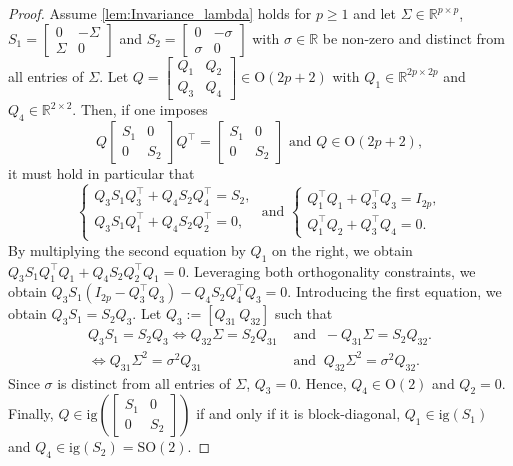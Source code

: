 \documentclass[10pt,a4paper]{amsart}
\begin{document}
\begin{proof}
		Assume \cref{lem:Invariance_lambda} holds for $p\geq 1$ and let $\Sigma\in\mathbb{R}^{p\times p}$, $S_1 = \left[\begin{smallmatrix}
			0&-\Sigma\\
			\Sigma& 0
			\end{smallmatrix}\right]$ and $S_2 = \left[\begin{smallmatrix}
			0&-\sigma\\
			\sigma& 0
			\end{smallmatrix}\right]$ with $\sigma\in\mathbb{R}$ be non-zero and distinct from all entries of $\Sigma$. Let $Q=\left[\begin{smallmatrix}
			Q_1&Q_2\\
			Q_3&Q_4
			\end{smallmatrix}\right]\in\mathrm{O}(2p+2)$ with $Q_1\in\mathbb{R}^{2p\times 2p}$ and $Q_4\in\mathbb{R}^{2\times 2}$. Then, if one imposes\begin{equation*}
			Q\begin{bmatrix}
			S_1&0\\
			0&S_2
			\end{bmatrix}Q^\top =\begin{bmatrix}
			S_1&0\\
			0&S_2
			\end{bmatrix} \text{ and } Q\in \mathrm{O}(2p+2),
			\end{equation*}
			it must hold in particular that
			\begin{equation*}
			\begin{cases}
			Q_3 S_1 Q_3^\top  + Q_4 S_2 Q_4^\top  = S_2,\\
			Q_3 S_1 Q_1^\top  + Q_4 S_2 Q_2^\top  = 0,\\
			\end{cases} \text{ and } \begin{cases}
			Q_1^\top Q_1 + Q_3^\top Q_3 = I_{2p},\\
			Q_1^\top Q_2 + Q_3^\top Q_4 = 0.
			\end{cases}
			\end{equation*}
			By multiplying the second equation by $Q_1$ on the right, we obtain $Q_3 S_1 Q_1^\top Q_1 + Q_4 S_2 Q_2^\top Q_1 = 0$. Leveraging both orthogonality constraints, we obtain $Q_3S_1(I_{2p}-Q_3^\top Q_3)-Q_4S_2Q_4^\top Q_3=0$. Introducing the first equation, we obtain $Q_3S_1=S_2Q_3$. Let $Q_3:=[Q_{31}\ Q_{32}]$ such that \begin{align*}
		Q_3S_1=S_2Q_3 \iff Q_{32}\Sigma = S_2 Q_{31} &\text{ and } \ -Q_{31}\Sigma= S_2Q_{32}.\\
		\iff Q_{31}\Sigma^2 = \sigma^2 Q_{31} &\text{ and } \ Q_{32}\Sigma^2 = \sigma^2 Q_{32}.
\end{align*}			 
 Since $\sigma$ is distinct from all entries of $\Sigma$, $Q_3=0$. Hence, $Q_4\in\mathrm{O}(2)$ and $Q_2=0$. Finally, $Q\in \mathrm{ig}\left(\left[\begin{smallmatrix}
			S_1&0\\
			0&S_2
			\end{smallmatrix}\right]\right)$ if and only if it is block-diagonal, $Q_1\in\mathrm{ig}(S_1)$ and $Q_4\in\mathrm{ig}(S_2)=\mathrm{SO}(2)$.
			

\end{proof}
\end{document}
